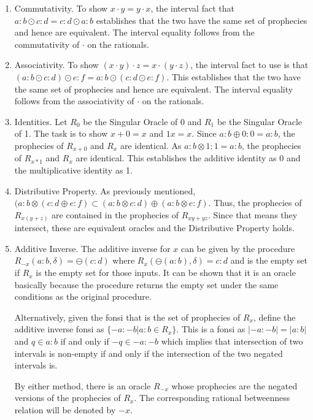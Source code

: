 \documentclass[12pt]{article}
\begin{document}
\begin{enumerate}
    \item Commutativity. To show $x\cdot y = y \cdot x$, the interval fact that $a:b \odot c:d = c:d \odot a:b$ establishes that the two have the same set of prophecies and hence are equivalent. The interval equality follows from the commutativity of $\cdot$  on the rationals. 
    \item Associativity. To show $(x\cdot y) \cdot z = x \cdot (y \cdot z)$, the interval fact to use is that $(a:b \odot c:d) \odot e:f = a:b \odot (c:d \odot e:f)$. This establishes that the two have the same set  of prophecies and hence are equivalent. The interval equality follows from the associativity of $\cdot$ on the rationals. 
    \item Identities. Let $R_0$ be the Singular Oracle of 0 and $R_1$ be the Singular Oracle of 1. The task is to show $x+0=x$ and $1x  = x$.  Since $a:b \oplus 0:0 = a:b$, the prophecies of $R_{x+0}$ and $R_x$ are identical. As $a:b \otimes 1:1 = a:b$, the prophecies of $R_{x*1}$ and $R_x$ are identical. This establishes the additive identity as 0 and the multiplicative identity as 1. 
    \item Distributive Property. As previously mentioned, $( a:b \otimes ( c:d \oplus e:f) \subset (a:b \otimes c:d) \oplus (a:b \otimes e:f)$. Thus, the prophecies of $R_{x(y+z)}$ are contained in the prophecies of $R_{xy + yz}$. Since that means they intersect, these are equivalent oracles and the Distributive Property holds. 
    \item Additive Inverse.  The additive inverse for $x$ can be given by the procedure $R_{-x}(a:b, \delta) = \ominus (c:d)$ where $R_x (\ominus (a:b), \delta) = c:d$  and is the empty set if $R_x$ is the empty set for those inputs. It can be shown that it is an oracle basically because the procedure returns the empty set under the same conditions as the original procedure.

    Alternatively, given the fonsi that is the set of prophecies of $R_x$, define the additive inverse fonsi as $\{-a:-b| a:b \in R_x\}$. This is a fonsi as $|-a:-b| = |a:b|$ and  $q \in a:b$ if and only if $-q \in -a:-b$ which implies that intersection of two intervals is non-empty if and only if the intersection of the two negated intervals is. 

    By either method, there is an oracle $R_{-x}$ whose prophecies are the negated versions of the prophecies of $R_x$. The corresponding rational betweenness relation will be denoted by $-x$.
    

\end{enumerate}
\end{document}
